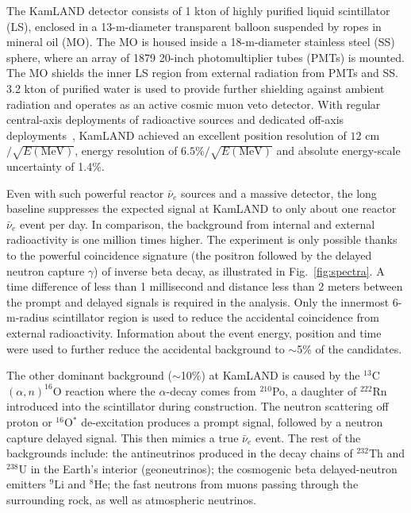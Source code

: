 The KamLAND detector consists of 1 kton of highly purified liquid scintillator (LS), enclosed in a 13-m-diameter transparent balloon suspended by ropes in mineral oil (MO). 
The MO is housed inside a 18-m-diameter stainless steel (SS) sphere, where an array of 1879 20-inch photomultiplier tubes (PMTs) is mounted. 
The MO shields the inner LS region from external radiation from PMTs and SS. 
3.2 kton of purified water is used to provide further shielding against ambient radiation and operates as an active cosmic muon veto detector. 
With regular central-axis deployments of radioactive sources and dedicated off-axis deployments~\cite{KamLAND-4pi}, KamLAND achieved an excellent position resolution of $12$ cm$/\sqrt{E(\textrm{MeV})}$, energy resolution of $6.5\%/\sqrt{E(\textrm{MeV})}$ and absolute energy-scale uncertainty of 1.4\%.

Even with such powerful reactor $\bar\nu_e$ sources and a massive detector, the long baseline suppresses the expected signal at KamLAND to only about one reactor $\bar\nu_e$ event per day. 
In comparison, the background from internal and external radioactivity is one million times higher. 
The experiment is only possible thanks to the powerful coincidence signature (the positron followed by the delayed neutron capture $\gamma$) of inverse beta decay, as illustrated in Fig.~\ref{fig:spectra}. 
A time difference of less than 1 millisecond and distance less than 2 meters between the prompt and delayed signals is required in the analysis. 
Only the innermost 6-m-radius scintillator region is used to reduce the accidental coincidence from external radioactivity. 
Information about the event energy, position and time were used to further reduce the accidental background to $\sim$5\% of the candidates.

The other dominant background ($\sim$10\%) at KamLAND is caused by the $^{13}$C$(\alpha,n)^{16}$O reaction where the $\alpha$-decay comes from $^{210}$Po, a daughter of $^{222}$Rn introduced into the scintillator during construction. 
The neutron scattering off proton or $^{16}$O$^*$ de-excitation produces a prompt signal, followed by a neutron capture delayed signal. This then mimics a true $\bar\nu_e$ event. The rest of the backgrounds include: the antineutrinos produced in the decay chains of $^{232}$Th and $^{238}$U in the Earth's interior (geoneutrinos); the cosmogenic beta delayed-neutron emitters $^{9}$Li and $^{8}$He;  the fast neutrons from muons passing through the surrounding rock, as well as atmospheric neutrinos. 

